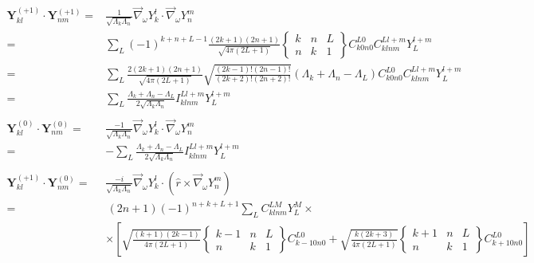 \documentclass[times]{aastex631}
\newcommand{\nabang}{\vec{\nabla}_{\omega}}
\newcommand{\ypvsh}[2]{\mathbf{Y}_{#1}^{(#2)}}
\begin{document}
\begin{align}
  \ypvsh{kl}{+1}\cdot\ypvsh{nm}{+1} = & \frac{1}{\sqrt{\Lambda_k\Lambda_n}}\nabang Y_k^l\cdot\nabang Y_n^m\nonumber \\
  = & \sum_{L}(-1)^{k+n+L-1}\frac{(2k+1)(2n+1)}{\sqrt{4\pi(2L+1)}}\begin{Bmatrix} k & n & L \\ n & k & 1 \end{Bmatrix} C_{k 0 n 0}^{L 0}C_{k l n m}^{L l+m}Y_L^{l+m}\nonumber \\ = & \sum_{L}\frac{2(2k+1)(2n+1)}{\sqrt{4\pi(2L+1)}}\sqrt{\frac{(2k-1)!(2n-1)!}{(2k+2)!(2n+2)!}}(\Lambda_k + \Lambda_n - \Lambda_L) C_{k 0 n 0}^{L 0}C_{k l n m}^{L l+m}Y_L^{l+m}\nonumber\\
  = & \sum_L\frac{\Lambda_k + \Lambda_n - \Lambda_L}{2\sqrt{\Lambda_k\Lambda_n}}I_{k l n m}^{L l+m}Y_L^{l+m}\label{eq:L-dot-L} \\
  \nonumber\\
  \ypvsh{kl}{0}\cdot\ypvsh{nm}{0} = & \frac{-1}{\sqrt{\Lambda_k\Lambda_n}}\nabang Y_k^l\cdot\nabang Y_n^m\nonumber \\
  = & -\sum_L\frac{\Lambda_k + \Lambda_n - \Lambda_L}{2\sqrt{\Lambda_k\Lambda_n}}I_{k l n m}^{L l+m}Y_L^{l+m}\label{eq:grad-dot-grad} \\
   \nonumber\\
   \ypvsh{kl}{+1}\cdot\ypvsh{nm}{0}
  = & \frac{-i}{\sqrt{\Lambda_k\Lambda_n}}\nabang Y_k^l \cdot \left(\hat{r}\times\nabang Y_n^m\right)\nonumber \\
  = &\,(2n+1)(-1)^{n+k+L+1}\sum_{L}C_{k l n m}^{L M}Y_L^M \times \nonumber \\
  & \times\left[\sqrt{\frac{(k+1)(2k-1)}{4\pi(2L+1)}}\begin{Bmatrix} k-1 & n & L \\ n & k & 1\end{Bmatrix}C_{k-1 0 n 0}^{L 0} + \sqrt{\frac{k(2k+3)}{4\pi(2L+1)}}\begin{Bmatrix}k+1 & n & L \\ n & k & 1\end{Bmatrix}C_{k+1 0 n 0}^{L 0}\right] \nonumber\\

\end{align}
\end{document}
